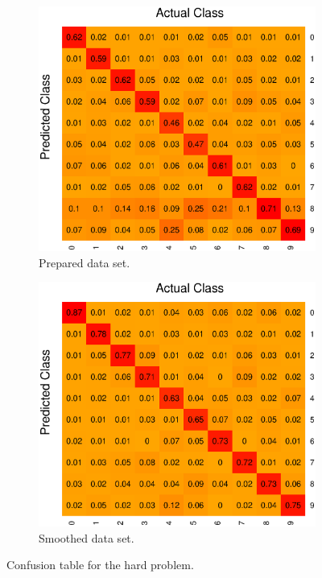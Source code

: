 \begin{figure}[H]
\centering
\begin{subfigure}{0.45\textwidth}
\includegraphics[width=\textwidth]{graphics/tree_confusion_all}
\caption{Prepared data set.}
\end{subfigure}
\begin{subfigure}{0.45\textwidth}
\includegraphics[width=\textwidth]{graphics/tree_confusion_all2}
\caption{Smoothed data set.}
\end{subfigure}
\caption[Confusion table for decision tree on the hard problem.]{Confusion table for the hard problem.}
\label{fig:tree_confus_all}
\end{figure}